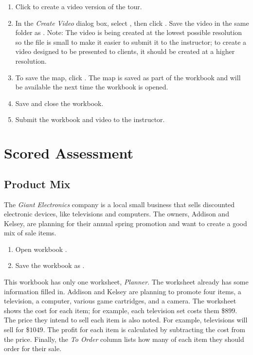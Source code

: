 \begin{enumerate}
	\item Click  to create a video version of the tour.
	\item In the \textit{Create Video} dialog box, select , then click . Save the video in the same folder as . Note: The video is being created at the lowest possible resolution so the file is small to make it easier to submit it to the instructor; to create a video designed to be presented to clients, it should be created at a higher resolution.
	\item To save the map, click . The map is saved as part of the workbook and will be available the next time the workbook is opened.
	\item Save and close the  workbook.
	\item Submit the  workbook and video to the instructor.
\end{enumerate}


\section{Scored Assessment}

\subsection{Product Mix}

The \textit{Giant Electronics} company is a local small business that sells discounted electronic devices, like televisions and computers. The owners, Addison and Kelsey, are planning for their annual spring promotion and want to create a good mix of sale items.

\begin{enumerate}
	\item Open workbook .
	\item Save the workbook as .
\end{enumerate}

This workbook has only one worksheet, \textit{Planner}. The worksheet already has some information filled in. Addison and Kelsey are planning to promote four items, a television, a computer, various game cartridges, and a camera. The worksheet shows the cost for each item; for example, each television set costs them \$$ 899 $. The price they intend to sell each item is also noted. For example, televisions will sell for \$$ 1049 $. The profit for each item is calculated by subtracting the cost from the price. Finally, the \textit{To Order} column lists how many of each item they should order for their sale.

